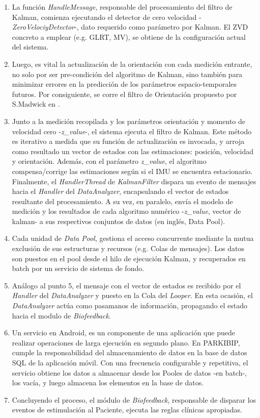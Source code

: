 \begin{enumerate}
    \item La función \textit{HandleMessage}, responsable del procesamiento del filtro de Kalman, comienza ejecutando el detector de cero velocidad -\textit{ZeroVelociyDetector}-, dato requerido como parámetro por Kalman. El ZVD  concreto a emplear (e.g. GLRT, MV), se obtiene de la configuración actual del sistema.
    \item Luego, es vital la actualización de la orientación con cada medición entrante, no solo por
    ser pre-condición del algoritmo de Kalman, sino también para minimizar errores en la predicción de los parámetros espacio-temporales futuros. Por consiguiente, se corre el filtro de Orientación propuesto por S.Madwick en \cite{Madgwick}.
    \item Junto a la medición recopilada y los parámetros orientación y momento de velocidad cero -\textit{z\_value}-, el sistema ejecuta el filtro de Kalman. Este método es iterativo a medida que su función de actualización es invocada, y arroja como resultado un vector de estados con las estimaciones: posición, velocidad y orientación. Además, con el parámetro \textit{z\_value}, el algoritmo compensa/corrige las estimaciones según si el IMU se encuentra estacionario.
    Finalmente, el \textit{HandlerThread} de \textit{KalmanFilter} dispara un evento de mensajes hacia el \textit{Handler} del \textit{DataAnalyzer}, encapsulando el vector de estados resultante del procesamiento. A su vez, en paralelo, envía el modelo de medición y los resultados de cada algoritmo numérico -\textit{z\_value}, vector de kalman- a sus respectivos conjuntos de datos (en inglés, Data Pool).
    \item Cada unidad de \textit{Data Pool}, gestiona el acceso concurrente mediante la mutua exclusión de sus estructuras y recursos (e.g. Colas de mensajes). Los datos son puestos en el pool desde el hilo de ejecución Kalman, y recuperados en batch por un servicio de sistema de fondo.
    \item Análogo al punto 5, el mensaje con el vector de estados es recibido por el \textit{Handler} del \textit{DataAnalyzer} y puesto en la Cola del \textit{Looper}. En esta ocasión, el \textit{DataAnalyzer} actúa como pasamanos de información, propagando el estado hacia el modulo de \textit{Biofeedback}.
    \item Un servicio en Android, es un componente de una aplicación que puede realizar operaciones de larga ejecución en segundo plano. En PARKIBIP, cumple la responsabilidad del almacenamiento de datos en la base de datos SQL de la aplicación móvil. Con una frecuencia configurable y repetitiva, el servicio obtiene los datos a almacenar desde los Pooles de datos -en batch-, los vacía, y luego almacena los elementos en la base de datos.
    \item Concluyendo el proceso, el módulo de \textit{Biofeedback}, responsable de disparar los eventos de estimulación al Paciente, ejecuta las reglas clínicas apropiadas.
\end{enumerate}

